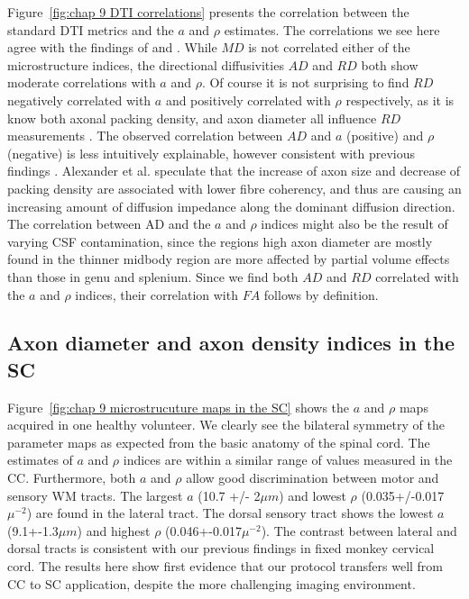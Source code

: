 Figure~\ref{fig:chap 9 DTI correlations} presents the correlation between the standard DTI metrics and the $a$ and $\rho$ estimates. The correlations we see here agree with the findings of \citep{Barazany:2009} and \citep{Alexander:2010}. While $MD$ is not correlated either of the microstructure indices, the directional diffusivities $AD$ and $RD$ both show moderate correlations with $a$ and $\rho$. Of course it is not surprising to find $RD$ negatively correlated with $a$ and positively correlated with $\rho$ respectively, as it is know both axonal packing density, and axon diameter all influence $RD$ measurements \citep{Beaulieu:2002}. The observed correlation between $AD$ and $a$ (positive) and $\rho$ (negative) is less intuitively explainable, however consistent with previous findings \citep{Barazany:2009,Alexander:2010}. Alexander et al. speculate that the increase of axon size and decrease of packing density are associated with lower fibre coherency, and thus are causing an increasing amount of diffusion impedance along the dominant diffusion direction. The correlation between AD and the $a$ and $\rho$ indices might also be the result of varying CSF contamination, since the regions high axon diameter are mostly found in the thinner midbody region are more affected by partial volume effects than those in genu and splenium. Since we find both $AD$ and $RD$ correlated with the $a$ and $\rho$ indices, their correlation with $FA$ follows by definition.  
\egroup %
\FloatBarrier
\subsection*{Axon diameter and axon density indices in the SC}
Figure~\ref{fig:chap 9 microstrucuture maps in the SC} shows the $a$ and $\rho$ maps acquired in one healthy volunteer. We clearly see the bilateral symmetry of the parameter maps as expected from the basic anatomy of the spinal cord. The estimates of $a$ and $\rho$ indices are within a similar range of values measured in the CC. Furthermore, both $a$ and $\rho$ allow good discrimination between motor and sensory WM tracts. The largest $a$ (10.7 +/- 2$\mu m$) and lowest $\rho$ (0.035+/-0.017$\mu^{-2}$) are found in the lateral tract. The dorsal sensory tract shows the lowest $a$ (9.1+-1.3$\mu m$) and highest $\rho$ (0.046+-0.017$\mu^{-2}$). The contrast between lateral and dorsal tracts is consistent with our previous findings in fixed monkey cervical cord. The results here show first evidence that our \SFasym{} protocol transfers well from CC to SC application, despite the more challenging imaging environment.

